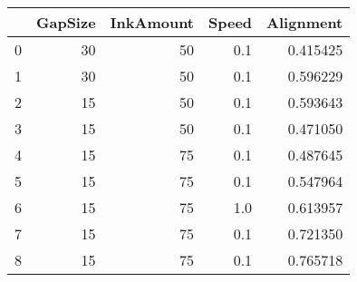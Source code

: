 \begin{tabular}{lrrrr}
\toprule
{} &  GapSize &  InkAmount &  Speed &  Alignment \\
\midrule
0 &       30 &         50 &    0.1 &   0.415425 \\
1 &       30 &         50 &    0.1 &   0.596229 \\
2 &       15 &         50 &    0.1 &   0.593643 \\
3 &       15 &         50 &    0.1 &   0.471050 \\
4 &       15 &         75 &    0.1 &   0.487645 \\
5 &       15 &         75 &    0.1 &   0.547964 \\
6 &       15 &         75 &    1.0 &   0.613957 \\
7 &       15 &         75 &    0.1 &   0.721350 \\
8 &       15 &         75 &    0.1 &   0.765718 \\
\bottomrule
\end{tabular}
